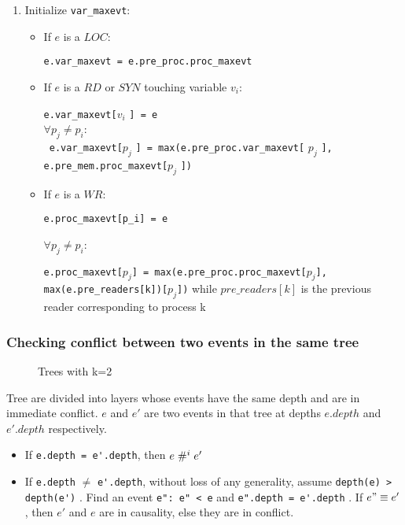 \documentclass{llncs}
\begin{document}
\begin{enumerate}
	\item {Initialize \verb!var_maxevt!:}
	\begin{itemize}
		\item
		If $e$ is a $LOC$:
		
		\verb!e.var_maxevt = e.pre_proc.proc_maxevt!
		\item
		If $e$ is a $RD$ or $SYN$ touching variable $v_i$: 
		
		\verb!e.var_maxevt[!$v_i$ \verb!] = e!\\
		$\forall p_j \neq p_i$: \\
		\verb! e.var_maxevt[!$p_j$ \verb!] = max(e.pre_proc.var_maxevt[! $p_j$ \verb!], e.pre_mem.proc_maxevt[!$p_j$ \verb!])!
		
		\item
		If $e$ is a $WR$: 
		
		\verb!e.proc_maxevt[p_i] = e!
		
		$\forall p_j \neq p_i$:
		
		\verb!e.proc_maxevt[!$p_j$\verb!] = max(e.pre_proc.proc_maxevt[!$p_j$\verb!], max(e.pre_readers[k])[!$p_j$\verb!])!
		while $pre\_readers[k]$ is the previous reader corresponding to process k 
	\end{itemize}	
\end{enumerate}


\subsubsection{Checking conflict between two events in the same tree}
\begin{figure}
	
	\caption{Trees with k=2 \label{fig:example}}
\end{figure}

Tree are divided into layers whose events have the same depth and are in immediate conflict.
$e$ and $e'$ are two events in that tree at depths $e.depth$ and $e'.depth$ respectively.
\begin{itemize}
	\item
	If \verb!e.depth = e'.depth!, then $e \mathrel{\#^i_{}} e'$
	\item
	If \verb!e.depth! $\neq$ \verb!e'.depth!, without loss of any generality, assume  \verb!depth(e) > depth(e')! . Find an event \verb!e": e" < e! and \verb!e".depth = e'.depth! . If $e" \equiv e'$, then $e'$ and $e$ are in causality, else they are in conflict.
\end{itemize}
\end{document}
